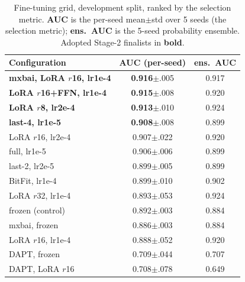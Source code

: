 \begin{table}[t]
\caption{Fine-tuning grid, development split, ranked by the
selection metric. \textbf{AUC} is the per-seed mean$\pm$std over 5 seeds (the
selection metric); \textbf{ens.\ AUC} is the 5-seed probability ensemble. Adopted
Stage-2 finalists in \textbf{bold}.}
\label{tab:ft-grid}
\centering
\small
\setlength{\tabcolsep}{4pt}
\begin{tabular}{@{}lcc@{}}
\toprule
\textbf{Configuration} & \textbf{AUC (per-seed)} & \textbf{ens.\ AUC} \\
\midrule
\textbf{mxbai, LoRA $r$16, lr1e-4}  & \textbf{0.916}{\footnotesize$\pm$.005} & 0.917 \\
\textbf{LoRA $r$16+FFN, lr1e-4}     & \textbf{0.915}{\footnotesize$\pm$.008} & 0.920 \\
\textbf{LoRA $r$8, lr2e-4}          & \textbf{0.913}{\footnotesize$\pm$.010} & 0.924 \\
\textbf{last-4, lr1e-5}             & \textbf{0.908}{\footnotesize$\pm$.008} & 0.899 \\
LoRA $r$16, lr2e-4                  & 0.907{\footnotesize$\pm$.022} & 0.920 \\
full, lr1e-5                        & 0.906{\footnotesize$\pm$.006} & 0.899 \\
last-2, lr2e-5                      & 0.899{\footnotesize$\pm$.005} & 0.899 \\
BitFit, lr1e-4                      & 0.899{\footnotesize$\pm$.010} & 0.902 \\
LoRA $r$32, lr1e-4                  & 0.893{\footnotesize$\pm$.053} & 0.924 \\
frozen (control)                   & 0.892{\footnotesize$\pm$.003} & 0.884 \\
mxbai, frozen                      & 0.886{\footnotesize$\pm$.003} & 0.884 \\
LoRA $r$16, lr1e-4                  & 0.888{\footnotesize$\pm$.052} & 0.920 \\
\midrule
DAPT, frozen                       & 0.709{\footnotesize$\pm$.044} & 0.707 \\
DAPT, LoRA $r$16                    & 0.708{\footnotesize$\pm$.078} & 0.649 \\
\bottomrule
\end{tabular}
\end{table}

